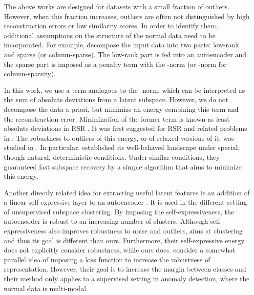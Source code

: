 \documentclass{article} \usepackage{iclr2020_conference,times}
\begin{document}
The above works are designed for datasets with a small fraction of outliers. However, when this fraction increases, outliers are often not distinguished by high reconstruction errors or low similarity scores. In order to identify them, additional assumptions on the structure
of the normal data need to be incorporated. For example, \citet{zhou2017anomaly} decompose the input data into two parts: low-rank and sparse (or column-sparse). The low-rank part is fed into an autoencoder and the sparse part is imposed as a penalty term with the -norm (or -norm for column-sparsity). 

In this work, we use a term analogous to the -norm, which can be interpreted as the sum of absolute deviations from a latent subspace. However, we do not decompose the data a priori, but minimize an energy combining this term and the reconstruction error.  Minimization of the former term is known as least absolute deviations in RSR  \citep{lerman2018overview}. It was first suggested for RSR and related problems in \citet{watson2001some, ding2006r, zhang2009median}. The robustness to outliers of this energy, or of relaxed versions of it, was studied in \citet{mccoy2011two, xu2012robust, lp_recovery_part1_11, zhang2014novel, lerman2015robust, lerman2017fast, maunu2017well}. In particular, \citet{maunu2017well} established its well-behaved landscape under special, though natural, deterministic conditions. Under similar conditions, they guaranteed fast subspace recovery by a simple algorithm that aims to minimize this energy.

Another directly related idea 
for extracting useful latent features 
is an addition of a linear self-expressive layer to an autoencoder \citep{ji2017deep}. It is used in the different setting of unsupervised subspace clustering. By imposing the self-expressiveness, the autoencoder is robust to an increasing number of clusters. Although self-expressiveness also improves robustness to noise and outliers,
\citet{ji2017deep} aims at clustering and thus its goal is different than ours. Furthermore, their self-expressive energy does not explicitly consider robustness, while ours does.
\citet{lezama2018ole} consider a somewhat parallel idea of imposing a loss function to increase the robustness of representation. However, their goal is to increase the margin between classes and their method only applies to a supervised setting in anomaly detection, where the normal data is multi-modal.
\end{document}
